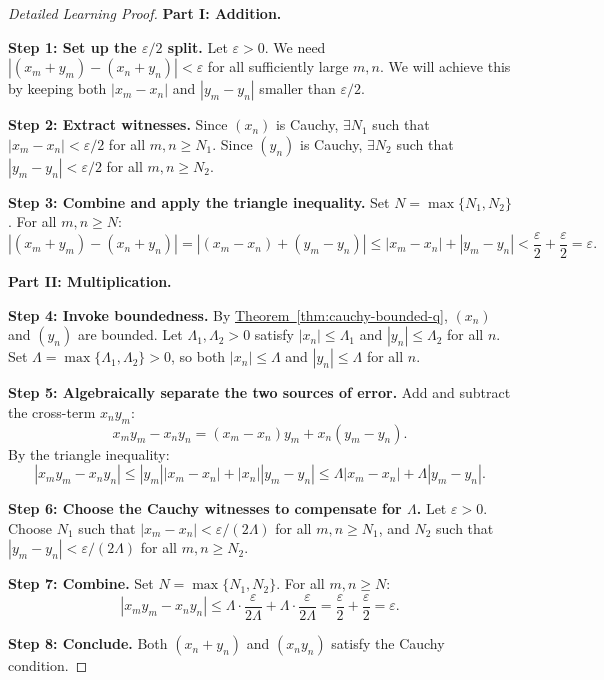 \begin{proof}[Detailed Learning Proof]
\LRAProofBodyStart
\textbf{Part I: Addition.}

\textbf{Step 1: Set up the $\varepsilon/2$ split.}
Let $\varepsilon > 0$.  We need $|(x_m+y_m)-(x_n+y_n)| < \varepsilon$
for all sufficiently large $m,n$.  We will achieve this by keeping both
$|x_m-x_n|$ and $|y_m-y_n|$ smaller than $\varepsilon/2$.

\textbf{Step 2: Extract witnesses.}
Since $(x_n)$ is Cauchy, $\exists N_1$ such that $|x_m-x_n|<\varepsilon/2$
for all $m,n \geq N_1$.
Since $(y_n)$ is Cauchy, $\exists N_2$ such that $|y_m-y_n|<\varepsilon/2$
for all $m,n \geq N_2$.

\textbf{Step 3: Combine and apply the triangle inequality.}
Set $N = \max\{N_1, N_2\}$.  For all $m, n \geq N$:
\[
|(x_m + y_m) - (x_n + y_n)|
= |(x_m - x_n) + (y_m - y_n)|
\leq |x_m - x_n| + |y_m - y_n|
< \frac{\varepsilon}{2} + \frac{\varepsilon}{2} = \varepsilon.
\]

\textbf{Part II: Multiplication.}

\textbf{Step 4: Invoke boundedness.}
By \hyperref[thm:cauchy-bounded-q]{Theorem~\ref*{thm:cauchy-bounded-q}},
$(x_n)$ and $(y_n)$ are bounded.  Let $\Lambda_1, \Lambda_2 > 0$ satisfy
$|x_n| \leq \Lambda_1$ and $|y_n| \leq \Lambda_2$ for all $n$.
Set $\Lambda = \max\{\Lambda_1, \Lambda_2\} > 0$, so both $|x_n| \leq \Lambda$
and $|y_n| \leq \Lambda$ for all $n$.

\textbf{Step 5: Algebraically separate the two sources of error.}
Add and subtract the cross-term $x_n y_m$:
\[
x_m y_m - x_n y_n
= (x_m - x_n)y_m + x_n(y_m - y_n).
\]
By the triangle inequality:
\[
|x_m y_m - x_n y_n|
\leq |y_m||x_m - x_n| + |x_n||y_m - y_n|
\leq \Lambda|x_m - x_n| + \Lambda|y_m - y_n|.
\]

\textbf{Step 6: Choose the Cauchy witnesses to compensate for $\Lambda$.}
Let $\varepsilon > 0$.  Choose $N_1$ such that $|x_m-x_n| < \varepsilon/(2\Lambda)$
for all $m, n \geq N_1$, and $N_2$ such that $|y_m-y_n| < \varepsilon/(2\Lambda)$
for all $m, n \geq N_2$.

\textbf{Step 7: Combine.}
Set $N = \max\{N_1, N_2\}$.  For all $m, n \geq N$:
\[
|x_m y_m - x_n y_n|
\leq \Lambda \cdot \frac{\varepsilon}{2\Lambda} + \Lambda \cdot \frac{\varepsilon}{2\Lambda}
= \frac{\varepsilon}{2} + \frac{\varepsilon}{2} = \varepsilon.
\]

\textbf{Step 8: Conclude.}
Both $(x_n + y_n)$ and $(x_n y_n)$ satisfy the Cauchy condition.
\end{proof}

